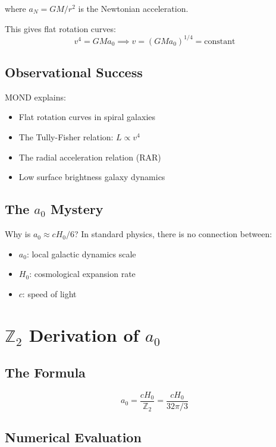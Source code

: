 \documentclass[12pt,a4paper]{article}
\begin{document}
where $a_N = GM/r^2$ is the Newtonian acceleration.

This gives flat rotation curves:
\begin{equation}
v^4 = GMa_0 \implies v = (GMa_0)^{1/4} = \text{constant}
\end{equation}

\subsection{Observational Success}

MOND explains:
\begin{itemize}
    \item Flat rotation curves in spiral galaxies
    \item The Tully-Fisher relation: $L \propto v^4$
    \item The radial acceleration relation (RAR)
    \item Low surface brightness galaxy dynamics
\end{itemize}

\subsection{The $a_0$ Mystery}

Why is $a_0 \approx cH_0/6$? In standard physics, there is no connection between:
\begin{itemize}
    \item $a_0$: local galactic dynamics scale
    \item $H_0$: cosmological expansion rate
    \item $c$: speed of light
\end{itemize}

\section{$\mathbb{Z}_2$ Derivation of $a_0$}

\subsection{The Formula}

\begin{equation}
a_0 = \frac{cH_0}{\mathbb{Z}_2} = \frac{cH_0}{32\pi/3}
\end{equation}

\subsection{Numerical Evaluation}
\end{document}
